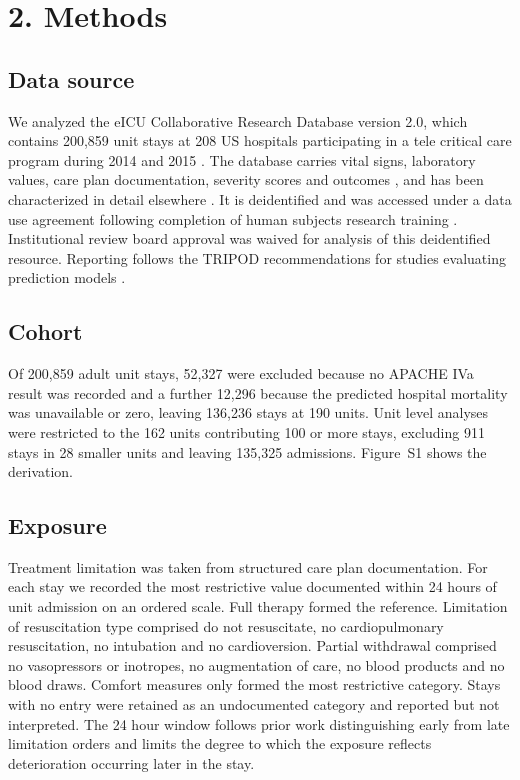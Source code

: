 \documentclass[12pt,a4paper]{article}
\begin{document}
\section*{2. Methods}

\subsection*{Data source}
We analyzed the eICU Collaborative Research Database version 2.0, which contains
200{,}859 unit stays at 208 US hospitals participating in a tele critical care
program during 2014 and 2015 \cite{ref30}. The database carries vital signs,
laboratory values, care plan documentation, severity scores and outcomes
\cite{ref30}, and has been characterized in detail elsewhere \cite{ref31}. It is
deidentified and was accessed under a data use agreement following completion of
human subjects research training \cite{ref30}. Institutional review board
approval was waived for analysis of this deidentified resource. Reporting follows
the TRIPOD recommendations for studies evaluating prediction models
\cite{ref32,ref33}.

\subsection*{Cohort}
Of 200{,}859 adult unit stays, 52{,}327 were excluded because no APACHE IVa result
was recorded and a further 12{,}296 because the predicted hospital mortality was
unavailable or zero, leaving 136{,}236 stays at 190 units. Unit level analyses were
restricted to the 162 units contributing 100 or more stays, excluding 911 stays in
28 smaller units and leaving 135{,}325 admissions. Figure~S1 shows the derivation.

\subsection*{Exposure}
Treatment limitation was taken from structured care plan documentation. For each
stay we recorded the most restrictive value documented within 24 hours of unit
admission on an ordered scale. Full therapy formed the reference. Limitation of
resuscitation type comprised do not resuscitate, no cardiopulmonary
resuscitation, no intubation and no cardioversion. Partial withdrawal comprised
no vasopressors or inotropes, no augmentation of care, no blood products and no
blood draws. Comfort measures only formed the most restrictive category. Stays
with no entry were retained as an undocumented category and reported but not
interpreted. The 24 hour window follows prior work distinguishing early from late
limitation orders \cite{ref10} and limits the degree to which the exposure
reflects deterioration occurring later in the stay.
\end{document}
